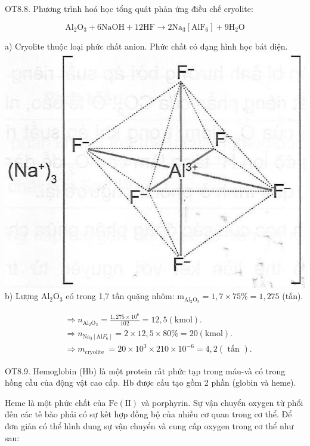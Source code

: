 \documentclass[10pt]{article}
\begin{document}
OT8.8. Phương trình hoá học tổng quát phản ứng điều chế cryolite:

$$
\mathrm{Al}_{2} \mathrm{O}_{3}+6 \mathrm{NaOH}+12 \mathrm{HF} \rightarrow 2 \mathrm{Na}_{3}\left[\mathrm{AlF}_{6}\right]+9 \mathrm{H}_{2} \mathrm{O}
$$

a) Cryolite thuộc loại phức chất anion. Phức chất có dạng hình học bát diện.\\
\includegraphics[max width=\textwidth, center]{2025_10_23_b4e16b74380d0f7e7700g-122(1)}\\
b) Lượng $\mathrm{Al}_{2} \mathrm{O}_{3}$ có trong 1,7 tấn quặng nhôm: $\mathrm{m}_{\mathrm{Al}_{2} \mathrm{O}_{3}}=1,7 \times 75 \%=1,275$ (tấn).

$$
\begin{aligned}
& \Rightarrow n_{\mathrm{Al}_{2} \mathrm{O}_{3}}=\frac{1,275 \times 10^{6}}{102}=12,5(\mathrm{kmol}) . \\
& \Rightarrow n_{\mathrm{Na}_{3}\left[\mathrm{Al} F_{6}\right]}=2 \times 12,5 \times 80 \%=20(\mathrm{kmol}) . \\
& \Rightarrow m_{\text {cryolite }}=20 \times 10^{3} \times 210 \times 10^{-6}=4,2(\text { tấn }) .
\end{aligned}
$$

OT8.9. Hemoglobin (Hb) là một protein rất phức tạp trong máu-và có trong hồng cầu của động vật cao cấp. Hb được cấu tạo gồm 2 phần (globin và heme).

Heme là một phức chất của $\mathrm{Fe}(\mathrm{II})$ và porphyrin. Sự vận chuyển oxygen từ phổi đến các tế bào phải có sự kết hợp đồng bộ của nhiều cơ quan trong cơ thể. Để đơn giản có thể hình dung sự vận chuyển và cung cấp oxygen trong cơ thể như sau:
\end{document}
